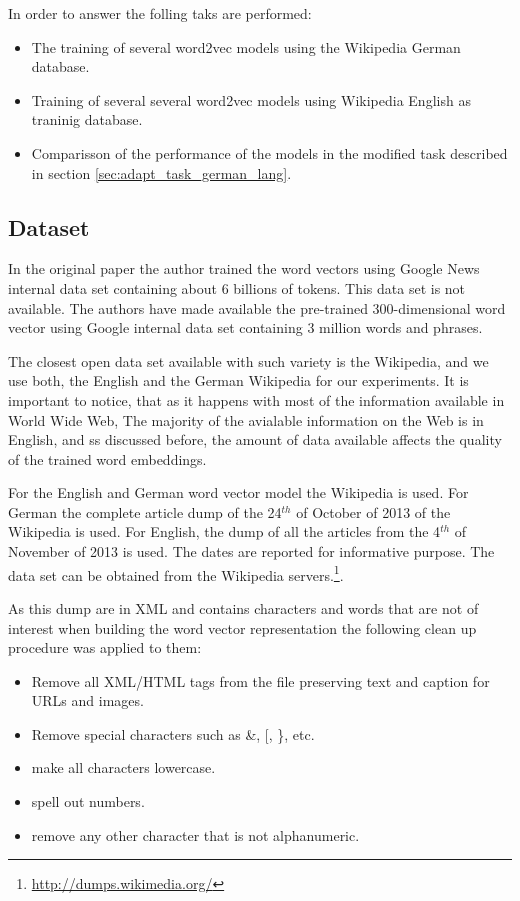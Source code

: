 In order to answer the folling taks are performed:

\begin{itemize}
\item The training of several word2vec models using the Wikipedia German
  database.
\item Training of several several word2vec models using Wikipedia English as
  traninig  database.
\item Comparisson of the performance of the models in the modified task
  described in section \ref{sec:adapt_task_german_lang}.
\end{itemize}


\subsection{Dataset}
\label{experiments:sub:dataset}

In the original paper \cite{DBLP:journals/corr/abs-1301-3781} the author
trained the word vectors using Google News internal data set containing about
6 billions of tokens. This data set is not available. The authors have made
available the pre-trained 300-dimensional  word vector  using Google internal
data set containing 3 million words and phrases.

The closest open data set available with such variety is the Wikipedia, and
we use both, the English and the German Wikipedia for our experiments.  It is
important to notice, that as it happens with most of the information
available in World Wide Web, The majority of the avialable information on the
Web is in English, and  ss discussed before, the amount of data available affects the quality  of the trained
word embeddings. 

For the English and German word vector model  the Wikipedia is used. For
German the complete article dump of the 24$^{th}$ of October of 2013  of the
Wikipedia is used.  For English, the dump of all the articles from the
4$^{th}$ of November of 2013 is used. The dates are reported for informative
purpose. The data set can be obtained from the Wikipedia
servers.\footnote{\url{http://dumps.wikimedia.org/}}.

As this dump are in XML and contains characters and words that are not of
interest when building the word vector  representation the following clean up
procedure was applied to them:

\begin{itemize}
\item Remove all XML/HTML tags from the file preserving text and caption for
 URLs and images.
\item Remove special characters such as \&,  [, \}, etc.
\item make all characters lowercase.
\item spell out numbers.
\item remove any other character that is not alphanumeric.
\end{itemize}

